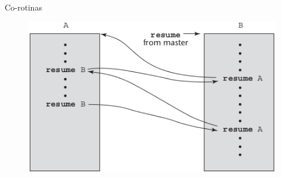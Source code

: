 \begin{frame}{Co-rotinas}
\begin{figure}[ht!]
 \centering
 \includegraphics[scale=0.5]{./imgs/coroutines_b.png}
\label{co-rotinas_b}
\end{figure}
\end{frame}



